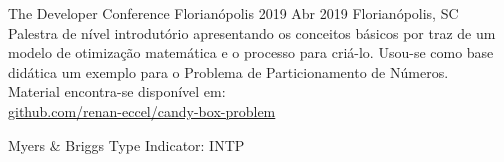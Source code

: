 \documentclass[10pt,a4paper]{altacv}
\begin{document}
\divider

\printbibliography[heading=pubtype,
                   title={\printinfo{\faGroup}
                   {Artigos em anais de conferências}},
                   type=inproceedings]


        {The Developer Conference Florianópolis 2019}
        {Abr 2019}
        {Florianópolis, SC}
Palestra de nível introdutório apresentando os conceitos básicos por traz
de um modelo de otimização matemática e o processo para criá-lo.
Usou-se como base didática um exemplo para o Problema de Particionamento de 
Números.\\
\vspace{0.25cm}
Material encontra-se disponível em:\\ 
\href{https://github.com/renan-eccel/candy-box-problem}
     {github.com/renan-eccel/candy-box-problem}





Myers \& Briggs Type Indicator: INTP








\end{document}
